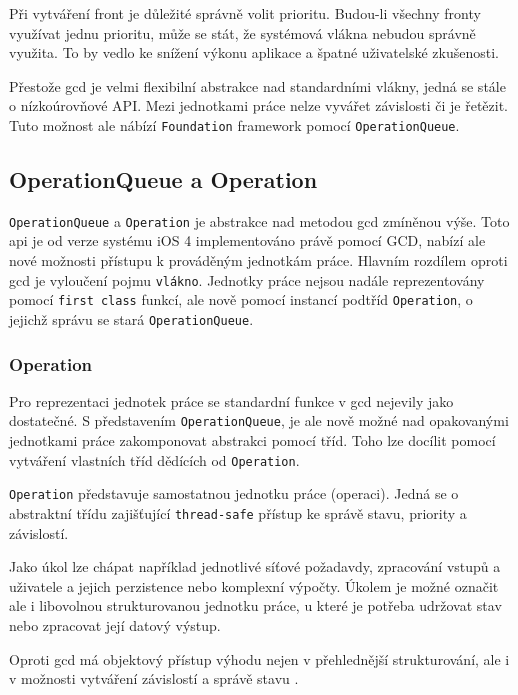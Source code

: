Při vytváření front je důležité správně volit prioritu.
Budou-li všechny fronty využívat jednu prioritu, může se stát, že systémová vlákna nebudou správně využita.
To by vedlo ke snížení výkonu aplikace a špatné uživatelské zkušenosti.

Přestože \acrshort{gcd} je velmi flexibilní abstrakce nad standardními vlákny, jedná se stále o nízkoúrovňové API.
Mezi jednotkami práce nelze vyvářet závislosti či je řetězit.
Tuto možnost ale nábízí \texttt{Foundation} framework pomocí \texttt{OperationQueue}.

\subsection{OperationQueue a Operation}

\texttt{OperationQueue} a \texttt{Operation} je abstrakce nad metodou \acrshort{gcd} zmíněnou výše.
Toto \acrshort{api} je od verze systému iOS 4 implementováno právě pomocí GCD, nabízí ale nové možnosti přístupu k prováděným jednotkám práce.
Hlavním rozdílem oproti \acrshort{gcd} je vyloučení pojmu \texttt{vlákno}.
Jednotky práce nejsou nadále reprezentovány pomocí \texttt{first class} funkcí, ale nově pomocí instancí podtříd \texttt{Operation}, o jejichž správu se stará \texttt{OperationQueue}. \cite{cocoacasts-nsoperation-vs-gcd}

\subsubsection*{Operation}

Pro reprezentaci jednotek práce se standardní funkce v \acrshort{gcd} nejevily jako dostatečné.
S představením \texttt{OperationQueue}, je ale nově možné nad opakovanými jednotkami práce zakomponovat abstrakci pomocí tříd.
Toho lze docílit pomocí vytváření vlastních tříd dědících od \texttt{Operation}.

\texttt{Operation} představuje samostatnou jednotku práce (operaci).
Jedná se o abstraktní třídu zajišťující \texttt{thread-safe} přístup ke správě stavu, priority a závislostí.

Jako úkol lze chápat například jednotlivé síťové požadavdy, zpracování vstupů a uživatele a jejich perzistence nebo komplexní výpočty.
Úkolem je možné označit ale i libovolnou strukturovanou jednotku práce, u které je potřeba udržovat stav nebo zpracovat její datový výstup.

Oproti \acrshort{gcd} má objektový přístup výhodu nejen v přehlednější strukturování, ale i v možnosti vytváření závislostí a správě stavu \cite{apple-operation-queues}.

